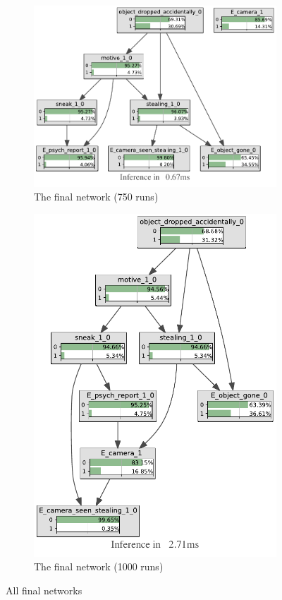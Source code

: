 \documentclass[12pt]{article}
\begin{document}
\begin{figure}[htbp]
\begin{center}
\begin{subfigure}{0.45\textwidth}
\includegraphics[width=\linewidth]{GroteMarktPrivate/bnImage/BNIMAGEGroteMarktPrivate750.pdf}
\caption{The final network (750 runs)}
\end{subfigure}
\begin{subfigure}{0.45\textwidth}
\includegraphics[width=\linewidth]{GroteMarktPrivate/bnImage/BNIMAGEGroteMarktPrivate1000.pdf}
\caption{The final network (1000 runs)}
\end{subfigure}
\caption{All final networks}
\label{bullet}
\end{center}
\end{figure}
\end{document}
